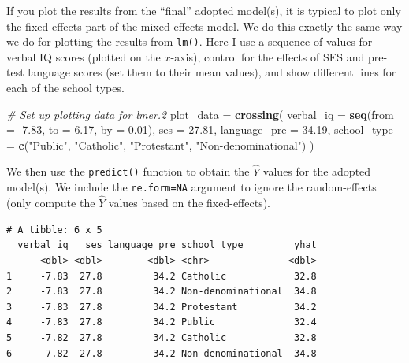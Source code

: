 \documentclass[]{book}
\newenvironment{Shaded}{\begin{snugshade}}{\end{snugshade}}
\newcommand{\CommentTok}[1]{\textcolor[rgb]{0.56,0.35,0.01}{\textit{#1}}}
\newcommand{\DataTypeTok}[1]{\textcolor[rgb]{0.13,0.29,0.53}{#1}}
\newcommand{\FloatTok}[1]{\textcolor[rgb]{0.00,0.00,0.81}{#1}}
\newcommand{\KeywordTok}[1]{\textcolor[rgb]{0.13,0.29,0.53}{\textbf{#1}}}
\newcommand{\NormalTok}[1]{#1}
\newcommand{\OperatorTok}[1]{\textcolor[rgb]{0.81,0.36,0.00}{\textbf{#1}}}
\newcommand{\OtherTok}[1]{\textcolor[rgb]{0.56,0.35,0.01}{#1}}
\newcommand{\StringTok}[1]{\textcolor[rgb]{0.31,0.60,0.02}{#1}}
\begin{document}
If you plot the results from the ``final'' adopted model(s), it is typical to plot only the fixed-effects part of the mixed-effects model. We do this exactly the same way we do for plotting the results from \texttt{lm()}. Here I use a sequence of values for verbal IQ scores (plotted on the \(x\)-axis), control for the effects of SES and pre-test language scores (set them to their mean values), and show different lines for each of the school types.

\begin{Shaded}
\begin{Highlighting}[]
\CommentTok{# Set up plotting data for lmer.2}
\NormalTok{plot_data =}\StringTok{ }\KeywordTok{crossing}\NormalTok{(}
  \DataTypeTok{verbal_iq =} \KeywordTok{seq}\NormalTok{(}\DataTypeTok{from =} \FloatTok{-7.83}\NormalTok{, }\DataTypeTok{to =} \FloatTok{6.17}\NormalTok{, }\DataTypeTok{by =} \FloatTok{0.01}\NormalTok{),}
  \DataTypeTok{ses =} \FloatTok{27.81}\NormalTok{,}
  \DataTypeTok{language_pre =} \FloatTok{34.19}\NormalTok{,}
  \DataTypeTok{school_type =} \KeywordTok{c}\NormalTok{(}\StringTok{"Public"}\NormalTok{, }\StringTok{"Catholic"}\NormalTok{, }\StringTok{"Protestant"}\NormalTok{, }\StringTok{"Non-denominational"}\NormalTok{)}
\NormalTok{)}
\end{Highlighting}
\end{Shaded}

We then use the \texttt{predict()} function to obtain the \(\hat{Y}\) values for the adopted model(s). We include the \texttt{re.form=NA} argument to ignore the random-effects (only compute the \(\hat{Y}\) values based on the fixed-effects).

\begin{Shaded}
\end{Shaded}

\begin{verbatim}
# A tibble: 6 x 5
  verbal_iq   ses language_pre school_type         yhat
      <dbl> <dbl>        <dbl> <chr>              <dbl>
1     -7.83  27.8         34.2 Catholic            32.8
2     -7.83  27.8         34.2 Non-denominational  34.8
3     -7.83  27.8         34.2 Protestant          34.2
4     -7.83  27.8         34.2 Public              32.4
5     -7.82  27.8         34.2 Catholic            32.8
6     -7.82  27.8         34.2 Non-denominational  34.8
\end{verbatim}
\end{document}
